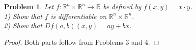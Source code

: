 \documentclass{article}
\newtheorem{problem}{Problem}
\begin{document}
\begin{flushleft}
\begin{problem}
Let $f : \mathbb{R}^n \times \mathbb{R}^n \rightarrow \mathbb{R}$ be defined by $f(x,y) = x \cdot y$.\\
1) Show that $f$ is differentiable on $\mathbb{R}^n \times \mathbb{R}^n$.\\
2) Show that $Df(a,b)(x,y) = ay + bx$.
\end{problem}
\begin{proof}
Both parts follow from Problems 3 and 4.
\end{proof}

\end{flushleft}
\end{document}

